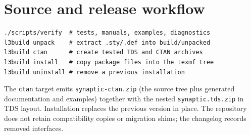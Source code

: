 \documentclass[a4paper,11pt]{scrartcl}
\begin{document}
\section{Source and release workflow}

\begin{verbatim}
./scripts/verify  # tests, manuals, examples, diagnostics
l3build unpack    # extract .sty/.def into build/unpacked
l3build ctan      # create tested TDS and CTAN archives
l3build install   # copy package files into the texmf tree
l3build uninstall # remove a previous installation
\end{verbatim}

The \texttt{ctan} target emits \texttt{synaptic-ctan.zip} (the source tree
plus generated documentation and examples) together with the nested
\texttt{synaptic.tds.zip} in TDS layout. Installation replaces the previous
version in place. The repository does not retain compatibility copies or
migration shims; the changelog records removed interfaces.
\end{document}
